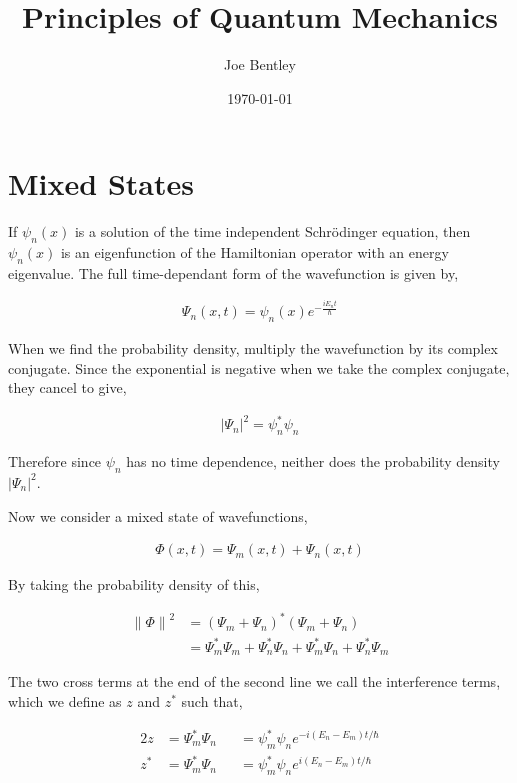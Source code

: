 \documentclass[11pt]{amsart}
\title{Principles of Quantum Mechanics}
\author{Joe Bentley}
\date{\today}
\begin{document}
\maketitle

\newpage

\section{Mixed States}

If $\psi_n(x)$ is a solution of the time independent Schr\"{o}dinger equation, then $\psi_n(x)$ is an eigenfunction of the Hamiltonian operator with an energy eigenvalue. The full time-dependant form of the wavefunction is given by,

\begin{align*}
  \Psi_n(x, t) = \psi_n(x) e^{-\frac{iE_nt}{\hbar}}
\end{align*}

When we find the probability density, multiply the wavefunction by its complex conjugate. Since the exponential is negative when we take the complex conjugate, they cancel to give,

\begin{align*}
  {|\Psi_n|}^2 = \psi^*_n\psi_n
\end{align*}

Therefore since $\psi_n$ has no time dependence, neither does the probability density ${|\Psi_n|}^2$.

Now we consider a mixed state of wavefunctions,

\begin{align*}
  \Phi(x, t) = \Psi_m(x, t) + \Psi_n(x, t)
\end{align*}

By taking the probability density of this,

\begin{align*}
  {\|\Phi\|}^2 &= {(\Psi_m + \Psi_n)}^* (\Psi_m + \Psi_n) \\
               &= \Psi_m^* \Psi_m + \Psi_n^* \Psi_n + \Psi_m^* \Psi_n + \Psi_n^* \Psi_m
\end{align*}

The two cross terms at the end of the second line we call the interference terms, which we define as $z$ and $z^*$ such that,

\begin{alignat*}{2}
  z &= \Psi^*_m \Psi_n &&= \psi_m^* \psi_n e^{-i(E_n - E_m)t / \hbar} \\
  z^* &= \Psi^*_m \Psi_n &&= \psi_m^* \psi_n e^{i(E_n - E_m)t / \hbar}
\end{alignat*}
\end{document}
